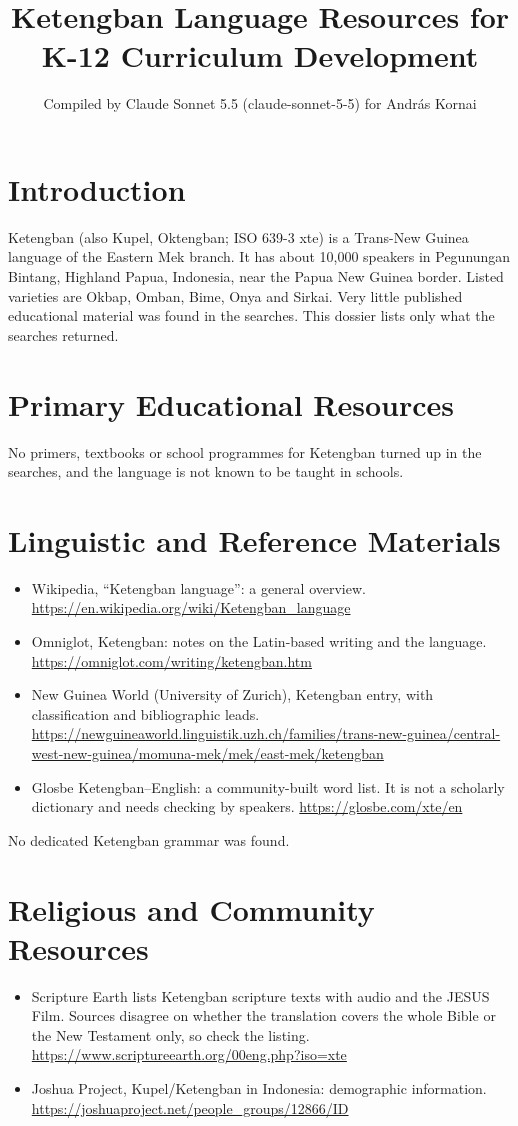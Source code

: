 \documentclass[12pt]{article}
\title{Ketengban Language Resources for K-12 Curriculum Development}
\author{Compiled by Claude Sonnet 5.5 (claude-sonnet-5-5) for Andr\'as Kornai}
\date{}
\begin{document}
\maketitle

\section{Introduction}
Ketengban (also Kupel, Oktengban; ISO 639-3 xte) is a Trans-New Guinea language of the Eastern Mek branch. It has about 10,000 speakers in Pegunungan Bintang, Highland Papua, Indonesia, near the Papua New Guinea border. Listed varieties are Okbap, Omban, Bime, Onya and Sirkai. Very little published educational material was found in the searches. This dossier lists only what the searches returned.

\section{Primary Educational Resources}
No primers, textbooks or school programmes for Ketengban turned up in the searches, and the language is not known to be taught in schools.

\section{Linguistic and Reference Materials}
\begin{itemize}
\item Wikipedia, ``Ketengban language'': a general overview. \url{https://en.wikipedia.org/wiki/Ketengban_language}
\item Omniglot, Ketengban: notes on the Latin-based writing and the language. \url{https://omniglot.com/writing/ketengban.htm}
\item New Guinea World (University of Zurich), Ketengban entry, with classification and bibliographic leads. \url{https://newguineaworld.linguistik.uzh.ch/families/trans-new-guinea/central-west-new-guinea/momuna-mek/mek/east-mek/ketengban}
\item Glosbe Ketengban--English: a community-built word list. It is not a scholarly dictionary and needs checking by speakers. \url{https://glosbe.com/xte/en}
\end{itemize}
No dedicated Ketengban grammar was found.

\section{Religious and Community Resources}
\begin{itemize}
\item Scripture Earth lists Ketengban scripture texts with audio and the JESUS Film. Sources disagree on whether the translation covers the whole Bible or the New Testament only, so check the listing. \url{https://www.scriptureearth.org/00eng.php?iso=xte}
\item Joshua Project, Kupel/Ketengban in Indonesia: demographic information. \url{https://joshuaproject.net/people_groups/12866/ID}
\end{itemize}
\end{document}
